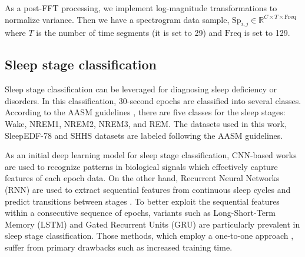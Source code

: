 As a post-FFT processing, we implement log-magnitude transformations to normalize variance. Then we have a spectrogram data sample, $\text{Sp}_{i,j} \in \mathbb{R}^{C \times T \times \text{Freq}}$ where $T$ is the number of time segments (it is set to 29) and $\text{Freq}$ is set to 129.

\subsection{Sleep stage classification} %

Sleep stage classification can be leveraged for diagnosing sleep deficiency or disorders. In this classification, 30-second epochs are classified into several classes. According to the AASM guidelines \cite{berry2012aasm}, there are five classes for the sleep stages: Wake, NREM1, NREM2, NREM3, and REM. The datasets used in this work, SleepEDF-78 and SHHS datasets are labeled following the AASM guidelines.

  
%



As an initial deep learning model for sleep stage classification, CNN-based works are used to recognize patterns in biological signals \cite{sors2018convolutional,phan2018joint} which effectively capture features of each epoch data.
%
On the other hand, Recurrent Neural Networks (RNN) are used to extract sequential features from continuous sleep cycles and predict transitions between stages \cite{michielli2019cascaded,mousavi2019sleepeegnet}. To better exploit the sequential features within a consecutive sequence of epochs, variants such as Long-Short-Term Memory (LSTM) \cite{hochreiter1997long} and Gated Recurrent Units (GRU) \cite{chung2014empirical} are particularly prevalent in sleep stage classification.
%
Those methods, which employ a one-to-one approach \cite{Phan2018_DNNwith1MaxPooling}, suffer from primary drawbacks such as increased training time.

